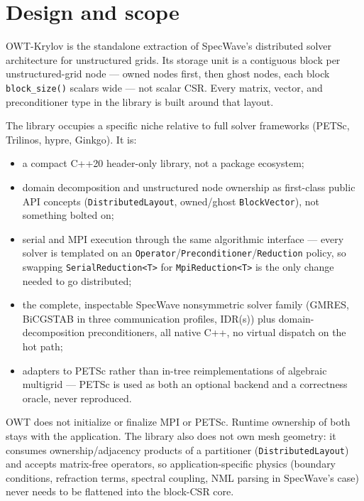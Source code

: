 \documentclass[11pt,a4paper]{report}
\begin{document}
\chapter{Design and scope}
\label{sec:1}

OWT-Krylov is the standalone extraction of SpecWave's distributed solver
architecture for unstructured grids. Its storage unit is a contiguous
block per unstructured-grid node --- owned nodes first, then ghost nodes,
each block \lstinline!block_size()! scalars wide --- not scalar CSR. Every
matrix, vector, and preconditioner type in the library is built around
that layout.

The library occupies a specific niche relative to full solver frameworks
(PETSc, Trilinos, hypre, Ginkgo). It is:

\begin{itemize}
\item a compact C++20 header-only library, not a package ecosystem;
\item domain decomposition and unstructured node ownership as first-class
  public API concepts (\lstinline!DistributedLayout!, owned/ghost
  \lstinline!BlockVector!), not something bolted on;
\item serial and MPI execution through the same algorithmic interface ---
  every solver is templated on an \lstinline!Operator!/\lstinline!Preconditioner!/\lstinline!Reduction!
  policy, so swapping \lstinline!SerialReduction<T>! for \lstinline!MpiReduction<T>! is the
  only change needed to go distributed;
\item the complete, inspectable SpecWave nonsymmetric solver family
  (GMRES, BiCGSTAB in three communication profiles, IDR(s)) plus
  domain-decomposition preconditioners, all native C++, no virtual
  dispatch on the hot path;
\item adapters to PETSc rather than in-tree reimplementations of
  algebraic multigrid --- PETSc is used as both an optional backend and
  a correctness oracle, never reproduced.
\end{itemize}

OWT does not initialize or finalize MPI or PETSc. Runtime ownership of
both stays with the application. The library also does not own mesh
geometry: it consumes ownership/adjacency products of a partitioner
(\lstinline!DistributedLayout!) and accepts matrix-free operators, so
application-specific physics (boundary conditions, refraction terms,
spectral coupling, NML parsing in SpecWave's case) never needs to be
flattened into the block-CSR core.
\end{document}
